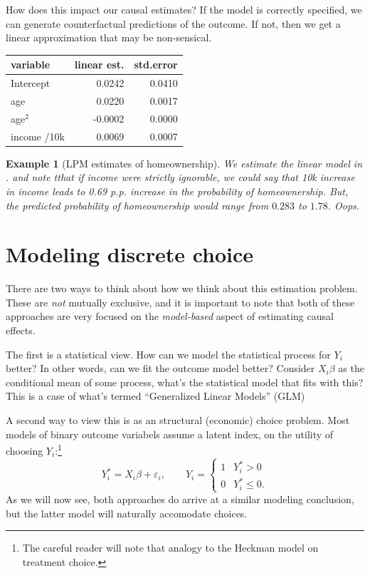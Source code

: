 \documentclass{tufte-handout}
\theoremstyle{break}
\newtheorem{exmp}{Example}
\begin{document}
How does this impact our causal estimates? If the model is correctly specified, we can generate  counterfactual predictions of the outcome. If not, then we get a linear approximation that may be non-sensical.
  \begin{margintable}
    \caption{LPM model estimates}
    \label{tab:lpm}
    \begin{tabular}{lrr}
        variable &  linear est.  &  std.error\\
        \midrule
        Intercept & 0.0242 &   0.0410\\
        age&   0.0220 &   0.0017\\
        age$^2$&  -0.0002 &   0.0000\\
        income /10k&   0.0069    & 0.0007\\
        \end{tabular}
  \end{margintable}
\begin{boxD}
\begin{exmp}[LPM estimates of homeownership]
    \label{example:homeownership}
We estimate the linear model in . and note tthat if income were strictly ignorable, we could say that 10k increase in income leads to 0.69 p.p. increase in the probability of homeownership. But, the predicted probability of homeownership would range from $0.283$ to  $1.78$. Oops.
\end{exmp}
\end{boxD}

\section{Modeling discrete choice}
There are two ways to think about how we think about this estimation problem. These are \emph{not} mutually exclusive, and it is important to note that both of these approaches are very focused on the \emph{model-based} aspect of estimating causal effects. 

The first is a statistical view. How can we model the statistical process for $Y_{i}$ better? In other words, can we fit the outcome model better? Consider $X_{i}\beta$ as the conditional mean of some process, what's the statistical model that fits with this? This is a case of what's termed ``Generalized Linear Models'' (GLM)

A second way to view this is as an structural (economic) choice problem.  Most models of  binary outcome variabels assume a latent index, on the utility of choosing $Y_{i}$:\footnote{The careful reader will note that analogy to the Heckman model on treatment choice. }
    \begin{equation}
        Y^{*}_{i} = X_{i}\beta + \varepsilon_{i}, \qquad Y_{i} = 
    \begin{cases}
      1 & Y_{i}^{*}>0\\
      0 & Y_{i}^{*} \leq 0.
    \end{cases}
    \end{equation}
As we will now see, both approaches do arrive at a similar modeling conclusion, but the latter model will naturally accomodate choices.
\end{document}
